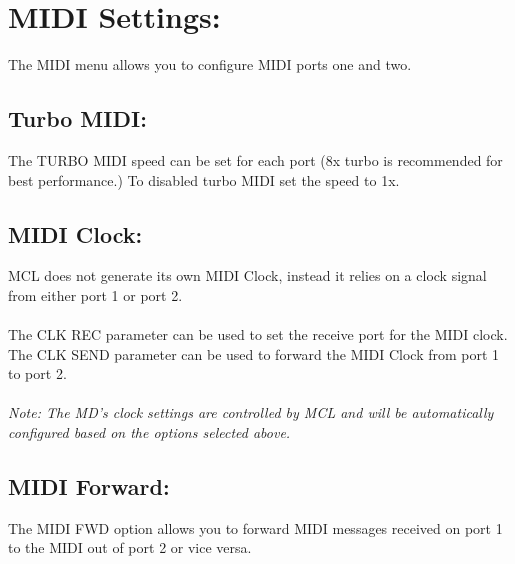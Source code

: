 \chapter{MIDI Settings:}
The MIDI menu allows you to configure MIDI ports one and two.
\section{Turbo MIDI:}
The TURBO MIDI speed can be set for each port (8x turbo is recommended for best performance.) To disabled turbo MIDI set the speed to 1x.
\section{MIDI Clock:}
MCL does not generate its own MIDI Clock, instead it relies on a clock signal from either port 1 or port 2.\\\\
The CLK REC parameter can be used to set the receive port for the MIDI clock.\\
The CLK SEND parameter can be used to forward the MIDI Clock from port 1 to port 2.\\\\
\textit{Note: The MD's clock settings are controlled by MCL and will be automatically configured based on the options selected above.}

\section{MIDI Forward:}
The MIDI FWD option allows you to forward MIDI messages received on port 1 to the MIDI out of port 2 or vice versa.

